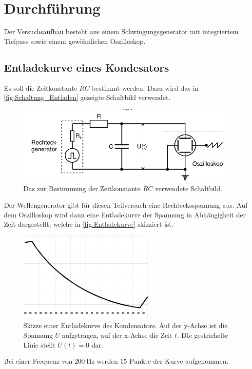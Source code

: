 \section{Durchführung}
\label{sec:Durchführung}
Der Versuchsaufbau besteht aus einem Schwingungsgenerator mit 
integriertem Tiefpass sowie einem gewöhnlichen Oszilloskop.
\subsection{Entladekurve eines Kondesators}
Es soll die Zeitkonstante $RC$ bestimmt werden. Dazu wird das in 
\autoref{fig:Schaltung_Entladen} gezeigte Schaltbild verwendet.
\begin{figure}
    \centering
    \includegraphics[width=\textwidth]{messdaten/Schaltung_Entladung.png}
    \caption{Das zur Bestimmung der Zeitkonstante $RC$ verwendete Schaltbild.}
    \label{fig:Schalung_Entladung}
\end{figure}
Der Wellengenerator gibt für diesen Teilversuch eine Rechtecksspannung aus.
Auf dem Oszilloskop wird dann eine Entladekurve der Spannung in Abhängigkeit
der Zeit dargestellt, welche in \autoref{fig:Entladekurve} skizziert ist.
\begin{figure}
    \centering
    \includegraphics[height=4.5cm]{messdaten/Entladekurve.png}
    \caption{Skizze einer Entladekurve des Kondensators. Auf der y-Achse ist
    die Spannung $U$ aufgetragen, auf der x-Achse die Zeit $t$. DIe gestrichelte
    Linie stellt $U(t)=0$ dar.}
    \label{fig:Entladekurve}
\end{figure}
Bei einer Frequenz von $\qty{200}{\hertz}$ werden 15 Punkte der Kurve aufgenommen. 
